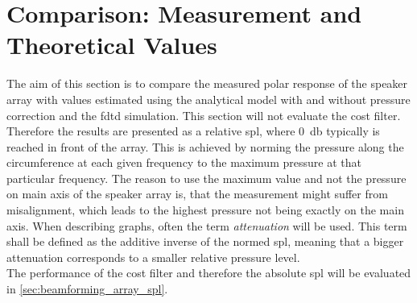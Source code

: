 \section{Comparison: Measurement and Theoretical Values}\label{sec:meas_vs_theory}

The aim of this section is to compare the measured polar response of the speaker array with values estimated using the analytical model with and without pressure correction and the \gls{fdtd} simulation. This section will not evaluate the cost filter. Therefore the results are presented as a relative \gls{spl}, where \SI{0}{\decibel} typically is reached in front of the array. This is achieved by norming the pressure along the circumference at each given frequency to the maximum pressure at that particular frequency.
The reason to use the maximum value and not the pressure on main axis of the speaker array is, that the measurement might suffer from misalignment, which leads to the highest pressure not being exactly on the main axis. 
When describing graphs, often the term \textit{attenuation} will be used. This term shall be defined as the additive inverse of the normed \gls{spl}, meaning that a bigger attenuation corresponds to a smaller relative pressure level.\\
The performance of the cost filter and therefore the absolute \gls{spl} will be evaluated in \autoref{sec:beamforming_array_spl}.\\

